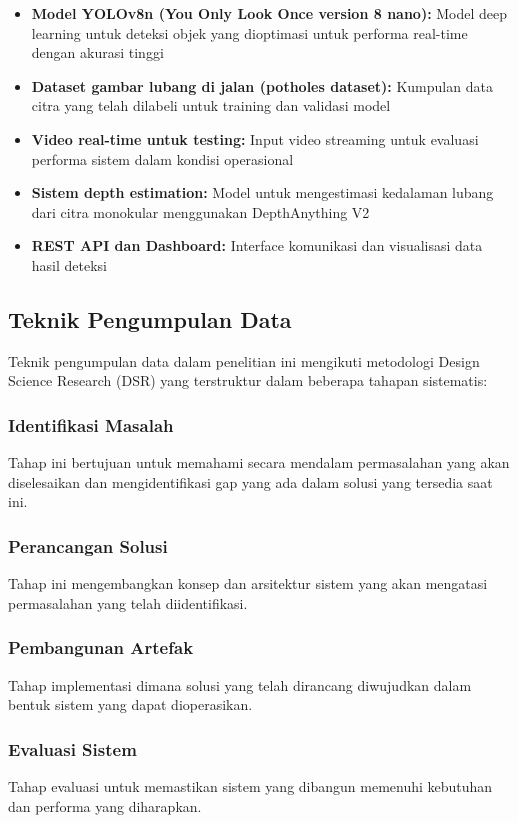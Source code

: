 \documentclass[12pt,a4paper]{article}
\begin{document}
\begin{itemize}
    \item \textbf{Model YOLOv8n (You Only Look Once version 8 nano):} Model deep learning untuk deteksi objek yang dioptimasi untuk performa real-time dengan akurasi tinggi \cite{redmon2016}
    \item \textbf{Dataset gambar lubang di jalan (potholes dataset):} Kumpulan data citra yang telah dilabeli untuk training dan validasi model
    \item \textbf{Video real-time untuk testing:} Input video streaming untuk evaluasi performa sistem dalam kondisi operasional
    \item \textbf{Sistem depth estimation:} Model untuk mengestimasi kedalaman lubang dari citra monokular menggunakan DepthAnything V2 \cite{depthanything2024}
    \item \textbf{REST API dan Dashboard:} Interface komunikasi dan visualisasi data hasil deteksi
\end{itemize}

\subsection{Teknik Pengumpulan Data}

Teknik pengumpulan data dalam penelitian ini mengikuti metodologi Design Science Research (DSR) yang terstruktur dalam beberapa tahapan sistematis:

\subsubsection{Identifikasi Masalah}
Tahap ini bertujuan untuk memahami secara mendalam permasalahan yang akan diselesaikan dan mengidentifikasi gap yang ada dalam solusi yang tersedia saat ini.

\subsubsection{Perancangan Solusi}
Tahap ini mengembangkan konsep dan arsitektur sistem yang akan mengatasi permasalahan yang telah diidentifikasi.

\subsubsection{Pembangunan Artefak}
Tahap implementasi dimana solusi yang telah dirancang diwujudkan dalam bentuk sistem yang dapat dioperasikan.

\subsubsection{Evaluasi Sistem}
Tahap evaluasi untuk memastikan sistem yang dibangun memenuhi kebutuhan dan performa yang diharapkan.
\end{document}
